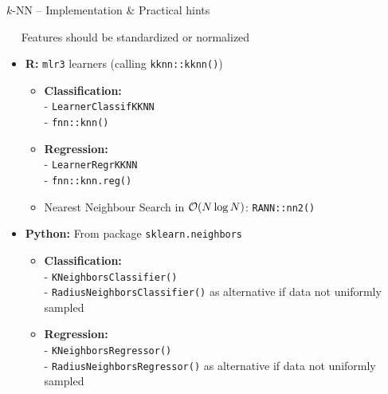 \begin{frame2}{$k$-NN -- Implementation \& Practical hints}

 ~~
Features should be standardized or normalized

\medskip

\begin{itemize}
  \item \textbf{R:} \texttt{mlr3} learners (calling \texttt{kknn::kknn()})
  \begin{itemize}
    \item \textbf{Classification:}\\ 
    - \texttt{LearnerClassifKKNN}\\
    - \texttt{fnn::knn()}
    \item \textbf{Regression:}\\
    - \texttt{LearnerRegrKKNN}\\
    - \texttt{fnn::knn.reg()}
    \item Nearest Neighbour Search in $\mathcal{O}(N \log N)$: \texttt{RANN::nn2()}
  \end{itemize}
\end{itemize}

\begin{itemize}
  \item \textbf{Python:} From package \texttt{sklearn.neighbors} 
  \begin{itemize}
    \item \textbf{Classification:}\\ 
    - \texttt{KNeighborsClassifier()}\\
    - \texttt{RadiusNeighborsClassifier()} as alternative if data not uniformly sampled
    \item \textbf{Regression:}\\
    - \texttt{KNeighborsRegressor()} \\
    - \texttt{RadiusNeighborsRegressor()} as alternative if data not uniformly sampled
  \end{itemize}
\end{itemize}
  
\end{frame2}

